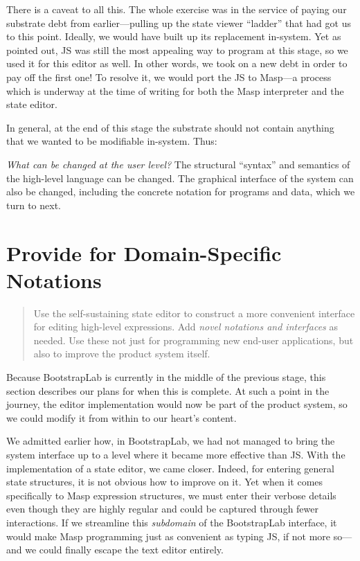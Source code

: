 \documentclass[ twoside,openright,titlepage,numbers=noenddot,headinclude,footinclude,cleardoublepage=empty,abstract=on,
                BCOR=5mm,paper=a4,fontsize=11pt
                ]{scrreprt}
\theoremstyle{definition}
\begin{document}
There is a caveat to all this. The whole exercise was in the service of
paying our substrate debt from earlier---pulling up the state viewer
``ladder'' that had got us to this point. Ideally, we would have built
up its replacement in-system. Yet as pointed out, \ac{JS} was still the
most appealing way to program at this stage, so we used it for this
editor as well. In other words, we took on a new debt in order to pay
off the first one! To resolve it, we would port the \ac{JS} to Masp---a
process which is underway at the time of writing for both the Masp
interpreter and the state editor.

In general, at the end of this stage the substrate should not contain
anything that we wanted to be modifiable in-system. Thus:

\emph{What can be changed at the user level?} The structural ``syntax''
and semantics of the high-level language can be changed. The graphical
interface of the system can also be changed, including the concrete
notation for programs and data, which we turn to next.

\hypertarget{provide-for-domain-specific-notations}{\section{Provide for Domain-Specific
Notations}\label{provide-for-domain-specific-notations}}

\begin{quote}
Use the self-sustaining state editor to construct a more convenient
interface for editing high-level expressions. Add \emph{novel notations
and interfaces} as needed. Use these not just for programming new
end-user applications, but also to improve the product system itself.
\end{quote}

Because BootstrapLab is currently in the middle of the previous stage,
this section describes our plans for when this is complete. At such a
point in the journey, the editor implementation would now be part of the
product system, so we could modify it from within to our heart's
content.

We admitted earlier how, in BootstrapLab, we had not managed to bring
the system interface up to a level where it became more effective than
\ac{JS}. With the implementation of a state editor, we came closer.
Indeed, for entering general state structures, it is not obvious how to
improve on it. Yet when it comes specifically to Masp expression
structures, we must enter their verbose details even though they are
highly regular and could be captured through fewer interactions. If we
streamline this \emph{subdomain} of the BootstrapLab interface, it would
make Masp programming just as convenient as typing \ac{JS}, if not more
so---and we could finally escape the text editor entirely.
\end{document}

